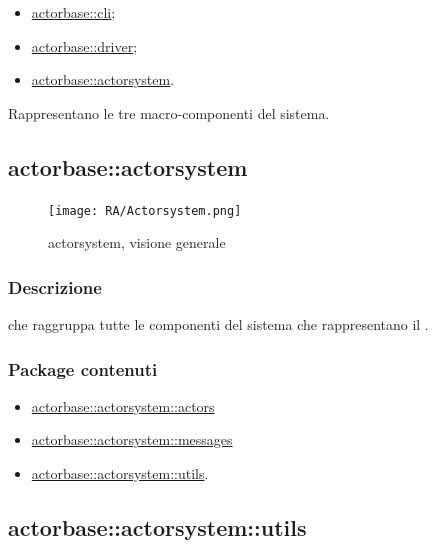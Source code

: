 \documentclass{scalatekids-article}
\begin{document}
\begin{itemize}
\item \hyperref[sec:actorbase::cli]{actorbase::cli};
\item \hyperref[sec:actorbase::driver]{actorbase::driver};
\item \hyperref[sec:actorbase::actorsystem]{actorbase::actorsystem}.
\end{itemize}

Rappresentano le tre macro-componenti del sistema.


\subsection{actorbase::actorsystem}
\label{sec:actorbase::actorsystem}

\begin{figure}[H]
  \begin{center}
    \texttt{[image: RA/Actorsystem.png]}
    \caption{ actorsystem, visione generale}
  \end{center}
\end{figure}

\subsubsection{Descrizione}

 che raggruppa tutte le componenti del sistema che
rappresentano il .

\subsubsection{Package contenuti}

\begin{itemize}
\item \hyperref[sec:actorbase::actorsystem::actors]{actorbase::actorsystem::actors}
\item \hyperref[sec:actorbase::actorsystem::messages]{actorbase::actorsystem::messages}
\item \hyperref[sec:actorbase::actorsystem::utils]{actorbase::actorsystem::utils}.
\end{itemize}

\subsection{actorbase::actorsystem::utils}
\label{sec:actorbase::actorsystem::utils}
\end{document}
